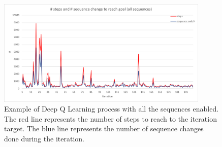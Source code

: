         \begin{figure}
            \centering
            \includegraphics[width=0.9\textwidth]{images/ALL_SEQ_QLEARN.png}
            \caption{Example of Deep Q Learning process with all the sequences enabled. The red line represents the number of steps to reach to the iteration target. The blue line represents the number of sequence changes done during the iteration.}
            \label{fig:all_sequences}
        \end{figure}
        